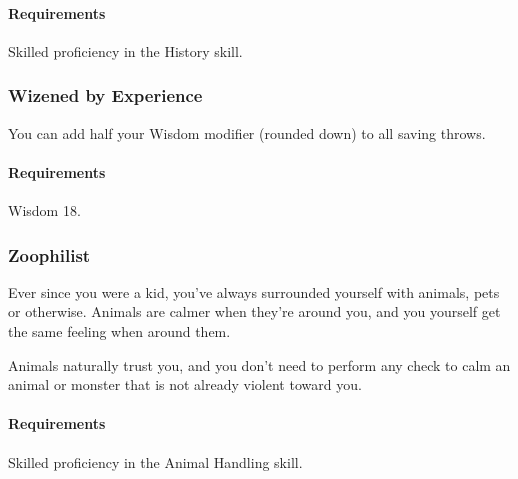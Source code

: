     \paragraph{Requirements} Skilled proficiency in the History skill.
\subsubsection{Wizened by Experience} \label{feat::wizenedbyexperience}
    You can add half your Wisdom modifier (rounded down) to all saving throws.
    \paragraph{Requirements} Wisdom 18.
\subsubsection{Zoophilist} \label{feat::zoophilist}
    Ever since you were a kid, you've always surrounded yourself with animals, pets or otherwise.
    Animals are calmer when they're around you, and you yourself get the same feeling when around them.

    Animals naturally trust you, and you don't need to perform any check to calm an animal or monster that is not already violent toward you.
    \paragraph{Requirements} Skilled proficiency in the Animal Handling skill.

\newpage
